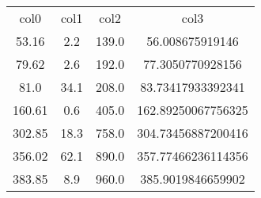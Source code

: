 \begin{table}
\begin{tabular}{cccc}
col0 & col1 & col2 & col3 \\
53.16 & 2.2 & 139.0 & 56.008675919146 \\
79.62 & 2.6 & 192.0 & 77.3050770928156 \\
81.0 & 34.1 & 208.0 & 83.73417933392341 \\
160.61 & 0.6 & 405.0 & 162.89250067756325 \\
302.85 & 18.3 & 758.0 & 304.73456887200416 \\
356.02 & 62.1 & 890.0 & 357.77466236114356 \\
383.85 & 8.9 & 960.0 & 385.9019846659902 \\
\end{tabular}
\end{table}
